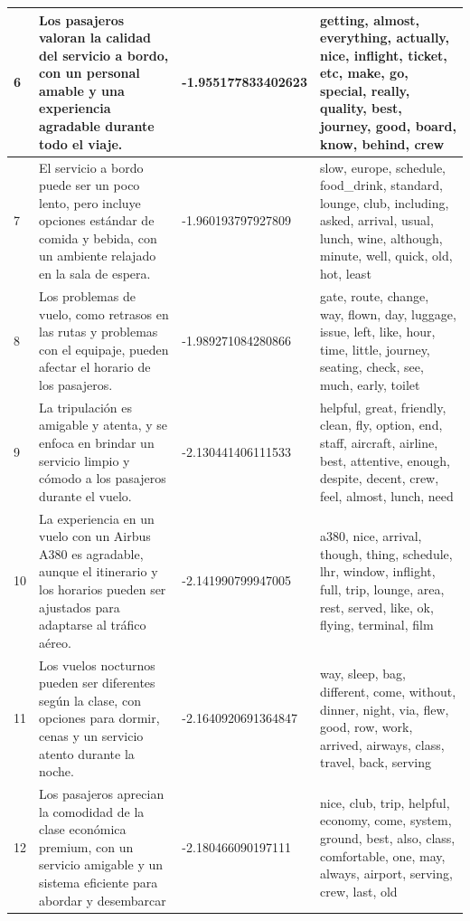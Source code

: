 \documentclass{report}
\begin{document}
{\begin{longtable}{|p{1cm}|p{4cm}|p{4cm}|p{6cm}|}
                    \hline
                    6 & Los pasajeros valoran la calidad del servicio a bordo, con un personal amable y una experiencia agradable durante todo el viaje. & -1.955177833402623 & getting, almost, everything, actually, nice, inflight, ticket, etc, make, go, special, really, quality, best, journey, good, board, know, behind, crew \\
                    \hline
                    7 & El servicio a bordo puede ser un poco lento, pero incluye opciones estándar de comida y bebida, con un ambiente relajado en la sala de espera. & -1.960193797927809 & slow, europe, schedule, food\_drink, standard, lounge, club, including, asked, arrival, usual, lunch, wine, although, minute, well, quick, old, hot, least \\
                    \hline
                    8 & Los problemas de vuelo, como retrasos en las rutas y problemas con el equipaje, pueden afectar el horario de los pasajeros. & -1.989271084280866 & gate, route, change, way, flown, day, luggage, issue, left, like, hour, time, little, journey, seating, check, see, much, early, toilet \\
                    \hline
                    9 & La tripulación es amigable y atenta, y se enfoca en brindar un servicio limpio y cómodo a los pasajeros durante el vuelo. & -2.130441406111533 & helpful, great, friendly, clean, fly, option, end, staff, aircraft, airline, best, attentive, enough, despite, decent, crew, feel, almost, lunch, need \\
                    \hline
                    10 & La experiencia en un vuelo con un Airbus A380 es agradable, aunque el itinerario y los horarios pueden ser ajustados para adaptarse al tráfico aéreo. & -2.141990799947005 & a380, nice, arrival, though, thing, schedule, lhr, window, inflight, full, trip, lounge, area, rest, served, like, ok, flying, terminal, film \\
                    \hline
                    11 & Los vuelos nocturnos pueden ser diferentes según la clase, con opciones para dormir, cenas y un servicio atento durante la noche. & -2.1640920691364847 & way, sleep, bag, different, come, without, dinner, night, via, flew, good, row, work, arrived, airways, class, travel, back, serving \\
                    \hline
                    12 & Los pasajeros aprecian la comodidad de la clase económica premium, con un servicio amigable y un sistema eficiente para abordar y desembarcar & -2.180466090197111 & nice, club, trip, helpful, economy, come, system, ground, best, also, class, comfortable, one, may, always, airport, serving, crew, last, old \\

\end{longtable}}
\end{document}
